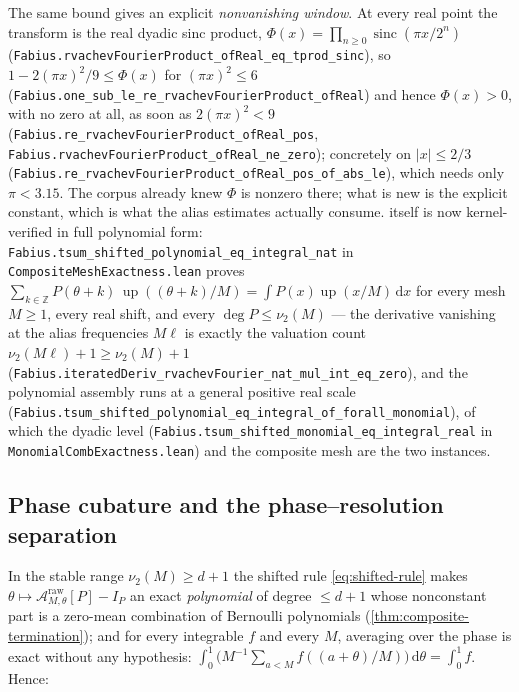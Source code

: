 \documentclass[11pt,oneside]{article}
\numberwithin{equation}{section}
\theoremstyle{definition}
\theoremstyle{remark}
\newcommand{\Z}{\mathbb Z}
\newcommand{\dd}{\,\mathrm d}
\newcommand{\Up}{\operatorname{up}}
\newcommand{\vtwo}{\nu_2}
\newcommand{\abs}[1]{\left\lvert #1\right\rvert}
\begin{document}
The same bound gives an explicit \emph{nonvanishing window}.  At every real point the
transform is the real dyadic sinc product,
\(\Phi(x)=\prod_{n\ge0}\operatorname{sinc}(\pi x/2^n)\)
(\nolinkurl{Fabius.rvachevFourierProduct_ofReal_eq_tprod_sinc}), so
\(1-2(\pi x)^2/9\le\Phi(x)\) for \((\pi x)^2\le6\)
(\nolinkurl{Fabius.one_sub_le_re_rvachevFourierProduct_ofReal}) and hence \(\Phi(x)>0\),
with no zero at all, as soon as \(2(\pi x)^2<9\)
(\nolinkurl{Fabius.re_rvachevFourierProduct_ofReal_pos},
\nolinkurl{Fabius.rvachevFourierProduct_ofReal_ne_zero}); concretely on \(\abs{x}\le2/3\)
(\nolinkurl{Fabius.re_rvachevFourierProduct_ofReal_pos_of_abs_le}), which needs only
\(\pi<3.15\).  The corpus already knew \(\Phi\) is nonzero there; what is new is the
explicit constant, which is what the alias estimates actually consume.
 itself is now kernel-verified in full polynomial form:
\nolinkurl{Fabius.tsum_shifted_polynomial_eq_integral_nat} in
\nolinkurl{CompositeMeshExactness.lean} proves
\(\sum_{k\in\Z}P(\theta+k)\,\Up((\theta+k)/M)=\int P(x)\Up(x/M)\dd x\) for every mesh
\(M\ge1\), every real shift, and every \(\deg P\le\vtwo(M)\) --- the derivative
vanishing at the alias frequencies \(M\ell\) is exactly the valuation count
\(\vtwo(M\ell)+1\ge\vtwo(M)+1\) (\nolinkurl{Fabius.iteratedDeriv_rvachevFourier_nat_mul_int_eq_zero}),
and the polynomial assembly runs at a general positive real scale
(\nolinkurl{Fabius.tsum_shifted_polynomial_eq_integral_of_forall_monomial}), of which the
dyadic level (\nolinkurl{Fabius.tsum_shifted_monomial_eq_integral_real} in
\nolinkurl{MonomialCombExactness.lean}) and the composite mesh are the two instances.

\subsection{Phase cubature and the phase--resolution separation}

In the stable range $\vtwo(M)\ge d+1$ the shifted rule
\eqref{eq:shifted-rule} makes
$\theta\mapsto\mathcal A^{\mathrm{raw}}_{M,\theta}[P]-I_P$ an exact
\emph{polynomial} of degree $\le d+1$ whose nonconstant part is a
zero-mean combination of Bernoulli polynomials
(\cref{thm:composite-termination}); and for every integrable $f$ and
every $M$, averaging over the phase is exact without any hypothesis:
$\int_0^1\bigl(M^{-1}\sum_{a<M}f((a+\theta)/M)\bigr)\dd\theta
=\int_0^1f$.  Hence:
\end{document}
